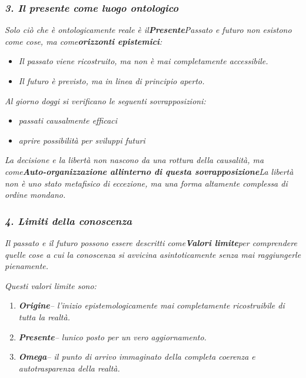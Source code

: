 \documentclass[
]{article}
\begin{document}
\subsubsection{\texorpdfstring{\emph{\textbf{3. Il presente come luogo ontologico}}}{3. Il presente come luogo ontologico}}\label{il-presente-come-luogo-ontologico}

\emph{Solo ciò che è ontologicamente reale è il\textbf{Presente}Passato e futuro non esistono come cose, ma come\textbf{orizzonti epistemici}:}

\begin{itemize}
\item
  \emph{Il passato viene ricostruito, ma non è mai completamente accessibile.}
\item
  \emph{Il futuro è previsto, ma in linea di principio aperto.}
\end{itemize}

\emph{Al giorno d\textquotesingle oggi si verificano le seguenti sovrapposizioni:}

\begin{itemize}
\item
  \emph{passati causalmente efficaci}
\item
  \emph{aprire possibilità per sviluppi futuri}
\end{itemize}

\emph{La decisione e la libertà non nascono da una rottura della causalità, ma come\textbf{Auto-organizzazione all\textquotesingle interno di questa sovrapposizione}La libertà non è uno stato metafisico di eccezione, ma una forma altamente complessa di ordine mondano.}

\subsubsection{\texorpdfstring{\emph{\textbf{4. Limiti della conoscenza}}}{4. Limiti della conoscenza}}\label{limiti-della-conoscenza}

\emph{Il passato e il futuro possono essere descritti come\textbf{Valori limite}per comprendere quelle cose a cui la conoscenza si avvicina asintoticamente senza mai raggiungerle pienamente.}

\emph{Questi valori limite sono:}

\begin{enumerate}
\def\labelenumi{\arabic{enumi}.}
\setcounter{enumi}{6}
\item
  \emph{\textbf{Origine}-- l'inizio epistemologicamente mai completamente ricostruibile di tutta la realtà.}
\item
  \emph{\textbf{Presente}-- l\textquotesingle unico posto per un vero aggiornamento.}
\item
  \emph{\textbf{Omega}-- il punto di arrivo immaginato della completa coerenza e autotrasparenza della realtà.}
\end{enumerate}
\end{document}
